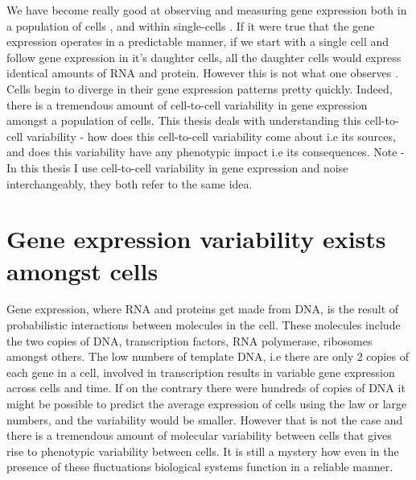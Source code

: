 We have become really good at observing and measuring gene expression both in a population of cells \cite{griffith2015pcb}, and within single-cells \cite{macosko2015c, newman2006na, xia2019pnasu, raj2006pb}. If it were true that the gene expression operates in a predictable manner, if we start with a single cell and follow gene expression in it's daughter cells, all the daughter cells would express identical amounts of RNA and protein. However this is not what one observes \cite{elowitz_stochastic_2002}. Cells begin to diverge in their gene expression patterns pretty quickly. Indeed, there is a tremendous amount of cell-to-cell variability in gene expression amongst a population of cells. This thesis deals with understanding this cell-to-cell variability - how does this cell-to-cell variability come about i.e its sources, and does this variability have any phenotypic impact i.e its consequences. Note - In this thesis I use cell-to-cell variability in gene expression and noise interchangeably, they both refer to the same idea.

\section{Gene expression variability exists amongst cells}

Gene expression, where RNA and proteins get made from DNA, is the result of probabilistic interactions between molecules in the cell. These molecules include the two copies of DNA, transcription factors, RNA polymerase, ribosomes amongst others. The low numbers of template DNA, i.e there are only 2 copies of each gene in a cell, involved in transcription results in variable gene expression across cells and time. If on the contrary there were hundreds of copies of DNA it might be possible to predict the average expression of cells using the law or large numbers, and the variability would be smaller. However that is not the case and there is a tremendous amount of molecular variability between cells that gives rise to phenotypic variability between cells. It is still a mystery how even in the presence of these fluctuations  biological systems function in a reliable manner.

